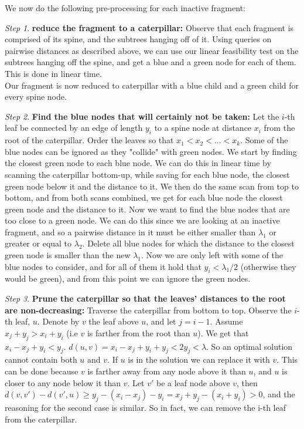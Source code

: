\documentclass[11pt,a4paper]{article}
\theoremstyle{definition}
\theoremstyle{remark}
\newtheorem{step}{Step}[section]
\begin{document}
We now do the following pre-processing for each inactive fragment:
\begin{step}
\textbf{reduce the fragment to a caterpillar:}
Observe that each fragment is comprised of its spine, and the subtrees hanging off of it. Using queries on pairwise distances as described above, we can use our linear feasibility test on the subtrees hanging off the spine, and get a blue and a green node for each of them. This is done in linear time.\\
Our fragment is now reduced to caterpillar with a blue child and a green child for every spine node.
\end{step}
\begin{step}\label{removing green nodes}
\textbf{Find the blue nodes that will certainly not be taken:}
Let the $i$-th leaf be connected by an edge of length $y_i$ to a spine node at distance $x_i$ from the root of the caterpillar. Order the leaves so that $x_1 < x_2 < ... < x_k$.
Some of the blue nodes can be ignored as they "collide" with green nodes. We start by finding the closest green node to each blue node. We can do this in linear time by scanning the caterpillar bottom-up, while saving for each blue node, the closest green node below it and the distance to it. We then do the same scan from top to bottom, and from both scans combined, we get for each blue node the closest green node and the distance to it. Now we want to find the blue nodes that are too close to a green node. We can do this since we are looking at an inactive fragment, and so a pairwise distance in it must be either smaller than $\lambda_1$ or greater or equal to $\lambda_2$. Delete all blue nodes for which the distance to the closest green node is smaller than the new $\lambda_1$. 
Now we are only left with some of the blue nodes to consider, and for all of them it hold that $y_i < \lambda_1/2$ (otherwise they would be green), and from this point we can ignore the green nodes.
\end{step}
\begin{step}
\textbf{Prune the caterpillar so that the leaves' distances to the root are non-decreasing:}
Traverse the caterpillar from bottom to top. Observe the $i$-th leaf, $u$. Denote by $v$ the leaf above $u$, and let  $j=i-1$. Assume $x_j+y_j > x_i+y_i$ (i.e $v$ is farther from the root than $u$). We get that $x_i-x_j+y_i < y_j$. $d(u,v) = x_i-x_j+y_i+y_j < 2y_j < \lambda$. So an optimal solution cannot contain both $u$ and $v$. If $u$ is in the solution we can replace it with $v$. This can be done because $v$ is farther away from any node above it than $u$, and $u$ is closer to any node below it than $v$. Let $v'$ be a leaf node above $v$, then $d(v,v') - d(v',u) \geq y_j-(x_i-x_j)-y_i = x_j+y_j-(x_i+y_i) > 0$, and the reasoning for the second case is similar.
So in fact, we can remove the i-th leaf from the caterpillar.
\end{step}
\end{document}
